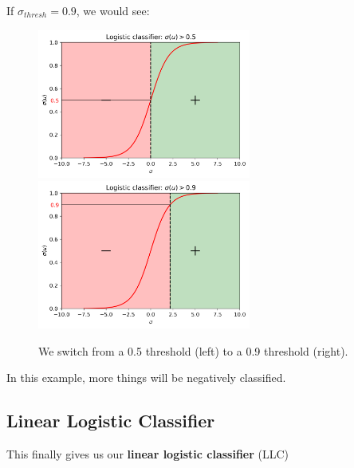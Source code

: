         \miniex If $\sigma_{thresh}=0.9$, we would see:
        
        \begin{figure}[H]
            
            \includegraphics[width=70mm,scale=0.5]{images/classification_images/sigmoid_.5.png}
            \includegraphics[width=70mm,scale=0.5]{images/classification_images/sigmoid_.9.png}
            \caption*{We switch from a 0.5 threshold (left) to a 0.9 threshold (right).}

        \end{figure}

        In this example, more things will be negatively classified.
        
    \subsection{Linear Logistic Classifier}
        
        This finally gives us our \textbf{linear logistic classifier} (LLC)\\
        
